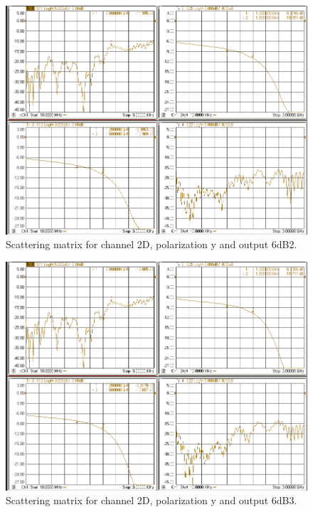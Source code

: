 \documentclass[12pt,a4paper,oneside]{article}
\begin{document}
\begin{figure}[H]
\centering
\includegraphics[width=0.9\linewidth]{VNA_results/2Dy_6dB2.png}
\caption{Scattering matrix for channel 2D, polarization y and output 6dB2.}
\label{fig:2Dy_6dB2}
\end{figure}


\begin{figure}[H]
\centering
\includegraphics[width=0.9\linewidth]{VNA_results/2Dy_6dB3.png}
\caption{Scattering matrix for channel 2D, polarization y and output 6dB3.}
\label{fig:2Dy_6dB3}
\end{figure}
\end{document}
